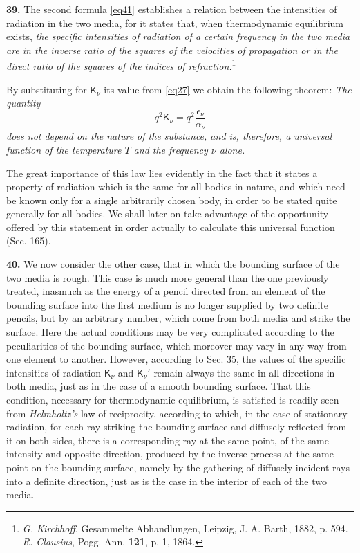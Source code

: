 \documentclass[12pt,oneside]{book}
\begin{document}
\textbf{39.} The second formula \eqref{eq41} establishes a relation between the intensities of radiation in the two media, for it states that, when thermodynamic equilibrium exists, \textit{the specific intensities of radiation of a certain frequency in the two media are in the inverse ratio of the squares of the velocities of propagation or in the direct ratio of the squares of the indices of refraction.}\footnote{\textit{G. Kirchhoff}, Gesammelte Abhandlungen, Leipzig, J. A. Barth, 1882, p. 594. \textit{R. Clausius}, Pogg. Ann. \textbf{121}, p. 1, 1864.} \par

By substituting for $\mathsf{K}_\nu$ its value from \eqref{eq27} we obtain the following theorem: \textit{The quantity}
\begin{equation}
    \label{eq42}
    q^2\mathsf{K}_\nu=q^2\frac{\epsilon_\nu}{\alpha_\nu}
\end{equation}
\textit{does not depend on the nature of the substance, and is, therefore, a universal function of the temperature $T$ and the frequency $\nu$ alone.} \par

The great importance of this law lies evidently in the fact that it states a property of radiation which is the same for all bodies in nature, and which need be known only for a single arbitrarily chosen body, in order to be stated quite generally for all bodies. We shall later on take advantage of the opportunity offered by this statement in order actually to calculate this universal function (Sec. 165). \par

\textbf{40.} We now consider the other case, that in which the bounding surface of the two media is rough. This case is much more general than the one previously treated, inasmuch as the energy of a pencil directed from an element of the bounding surface into the first medium is no longer supplied by two definite pencils, but by an arbitrary number, which come from both media and strike the surface. Here the actual conditions may be very complicated according to the peculiarities of the bounding surface, which moreover may vary in any way from one element to another. However, according to Sec. 35, the values of the specific intensities of radiation $\mathsf{K}_\nu$ and $\mathsf{K}_\nu'$ remain always the same in all directions in both media, just as in the case of a smooth bounding surface. That this condition, necessary for thermodynamic equilibrium, is satisfied is readily seen from \textit{Helmholtz's} law of reciprocity, according to which, in the case of stationary radiation, for each ray striking the bounding surface and diffusely reflected from it on both sides, there is a corresponding ray at the same point, of the same intensity and opposite direction, produced by the inverse process at the same point on the bounding surface, namely by the gathering of diffusely incident rays into a definite direction, just as is the case in the interior of each of the two media. \par
\end{document}
